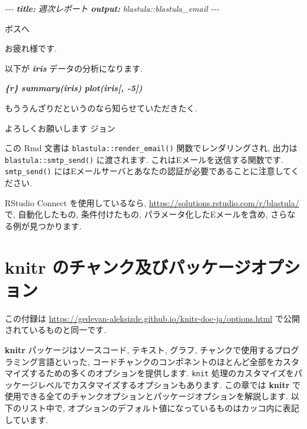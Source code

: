 \documentclass[
  11pt,
  lualatex,
  ja=standard]{bxjsreport}
\newenvironment{Shaded}{\begin{snugshade}}{\end{snugshade}}
\newcommand{\AnnotationTok}[1]{\textcolor[rgb]{0.56,0.35,0.01}{\textbf{\textit{#1}}}}
\newcommand{\CommentTok}[1]{\textcolor[rgb]{0.56,0.35,0.01}{\textit{#1}}}
\newcommand{\InformationTok}[1]{\textcolor[rgb]{0.56,0.35,0.01}{\textbf{\textit{#1}}}}
\newcommand{\NormalTok}[1]{#1}
\newenvironment{infobox}[1]{\begin{itemize}\renewcommand{\labelitemi}{\raisebox{-.7\height}[0pt][0pt]{%
  {\setkeys{Gin}{width=3em,keepaspectratio}\texttt{[image: \_latex/\_img/\#1]}}}}
  \setlength{\fboxsep}{1em}
  \begin{greyblock}
  \item
  }{\end{greyblock}\end{itemize}
}
\begin{document}
\begin{Shaded}
\begin{Highlighting}[]
\CommentTok{{-}{-}{-}}
\AnnotationTok{title:}\CommentTok{ 週次レポート}
\AnnotationTok{output:}\CommentTok{ blastula::blastula\_email}
\CommentTok{{-}{-}{-}} 

\NormalTok{ボスへ}

\NormalTok{お疲れ様です.}

\NormalTok{以下が }\InformationTok{\textasciigrave{}iris\textasciigrave{}}\NormalTok{ データの分析になります.}

\InformationTok{\textasciigrave{}\textasciigrave{}\textasciigrave{}\{r\}}
\InformationTok{summary(iris)}
\InformationTok{plot(iris[, {-}5])}
\InformationTok{\textasciigrave{}\textasciigrave{}\textasciigrave{}}

\NormalTok{もううんざりだというのなら知らせていただきたく.}

\NormalTok{よろしくお願いします}
\NormalTok{ジョン}
\end{Highlighting}
\end{Shaded}

この Rmd 文書は \texttt{blastula::render\_email()} 関数でレンダリングされ, 出力は \texttt{blastula::smtp\_send()} に渡されます. これはEメールを送信する関数です. \texttt{smtp\_send()} にはEメールサーバとあなたの認証が必要であることに注意してください.

RStudio Connect を使用しているなら, \url{https://solutions.rstudio.com/r/blastula/} で, 自動化したもの, 条件付けたもの, パラメータ化したEメールを含め, さらなる例が見つかります.

\hypertarget{appendix-ux88dcux907a}{%
\appendix}


\hypertarget{full-options}{%
\chapter{\texorpdfstring{\textbf{knitr} のチャンク及びパッケージオプション}{knitr のチャンク及びパッケージオプション}}\label{full-options}}

\begin{infobox}{tip}
この付録は \url{https://gedevan-aleksizde.github.io/knitr-doc-ja/options.html} で公開されているものと同一です.

\end{infobox}

\textbf{knitr} パッケージはソースコード, テキスト, グラフ, チャンクで使用するプログラミング言語といった, コードチャンクのコンポネントのほとんど全部をカスタマイズするための多くのオプションを提供します. \texttt{knit} 処理のカスタマイズをパッケージレベルでカスタマイズするオプションもあります. この章では \textbf{knitr} で使用できる全てのチャンクオプションとパッケージオプションを解説します. 以下のリスト中で, オプションのデフォルト値になっているものはカッコ内に表記しています.
\end{document}
